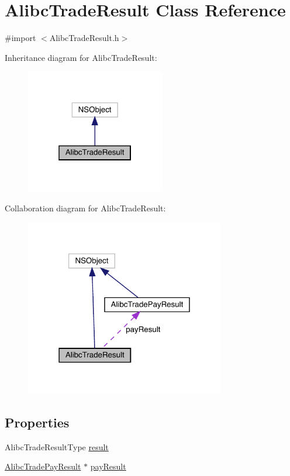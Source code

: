 \hypertarget{interface_alibc_trade_result}{}\section{Alibc\+Trade\+Result Class Reference}
\label{interface_alibc_trade_result}


{\ttfamily \#import $<$Alibc\+Trade\+Result.\+h$>$}



Inheritance diagram for Alibc\+Trade\+Result\+:\nopagebreak
\begin{figure}[H]
\begin{center}
\leavevmode
\includegraphics[width=172pt]{interface_alibc_trade_result__inherit__graph}
\end{center}
\end{figure}


Collaboration diagram for Alibc\+Trade\+Result\+:\nopagebreak
\begin{figure}[H]
\begin{center}
\leavevmode
\includegraphics[width=247pt]{interface_alibc_trade_result__coll__graph}
\end{center}
\end{figure}
\subsection*{Properties}
\begin{DoxyCompactItemize}
\item 
Alibc\+Trade\+Result\+Type \mbox{\hyperlink{interface_alibc_trade_result_a8c932a7e31aa178d212f59994ef5fd66}{result}}
\item 
\mbox{\hyperlink{interface_alibc_trade_pay_result}{Alibc\+Trade\+Pay\+Result}} $\ast$ \mbox{\hyperlink{interface_alibc_trade_result_a83f2192474fa3faa0401f7b160f777a3}{pay\+Result}}
\end{DoxyCompactItemize}



